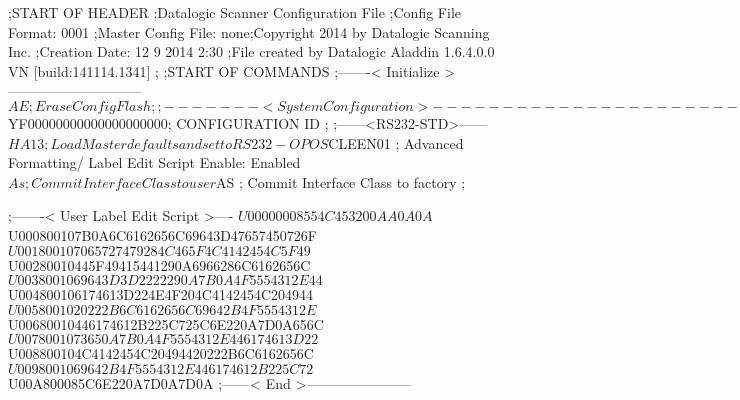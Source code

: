 ;START OF HEADER
;Datalogic Scanner Configuration File
;Config File Format: 0001
;Master Config File: none;Copyright 2014 by Datalogic Scanning Inc.
;Creation Date: 12 9 2014 2:30
;File created by Datalogic Aladdin 1.6.4.0.0 VN [build:141114.1341]
;
;START OF COMMANDS
;-------< Initialize >-----------------------------
$AE                 ; Erase Config Flash
;
;-------< System Configuration >-------------------------------
$YF00000000000000000000; CONFIGURATION ID
;
;------<RS232-STD>------
$HA13               ; Load Master defaults and set to RS232-OPOS
$CLEEN01            ; Advanced Formatting/ Label Edit Script Enable: Enabled
$As                 ; Commit Interface Class to user
$AS                 ; Commit Interface Class to factory
;

;-------< User Label Edit Script >----
$U00000008554C453200AA0A0A
$U000800107B0A6C6162656C69643D47657450726F
$U001800107065727479284C465F4C4142454C5F49
$U00280010445F49415441290A6966286C6162656C
$U0038001069643D3D2222290A7B0A4F5554312E44
$U004800106174613D224E4F204C4142454C204944
$U0058001020222B6C6162656C69642B4F5554312E
$U00680010446174612B225C725C6E220A7D0A656C
$U0078001073650A7B0A4F5554312E446174613D22
$U008800104C4142454C20494420222B6C6162656C
$U0098001069642B4F5554312E446174612B225C72
$U00A800085C6E220A7D0A7D0A
;------< End >-----------------------
